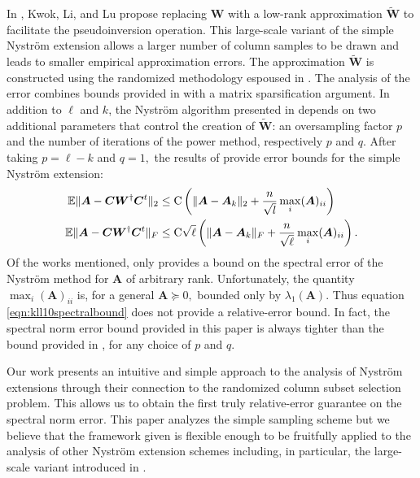 \documentclass[11pt,letterpaper,twoside,reqno,nosumlimits]{amsart}
\newcommand{\mat}[1]{\ensuremath{\bm{#1}}}
\newcommand{\E}{\ensuremath{\mathbb{E}}}
\theoremstyle{remark}
\begin{document}
  In \cite{KLL10}, Kwok, Li, and Lu propose replacing $\mat{W}$ with a low-rank approximation $\tilde{\mat{W}}$ to facilitate the pseudoinversion operation. This large-scale variant of the simple Nystr\"om extension allows a larger number of column samples to be drawn and leads to smaller empirical approximation errors. The approximation $\tilde{\mat{W}}$ is constructed using the randomized methodology espoused in \cite{HMT11}. The analysis of the error combines bounds provided in \cite{HMT11} with a matrix sparsification argument. In addition to $\ell$ and $k$, the Nystr\"om algorithm presented in \cite{KLL10} depends on two additional parameters that control the creation of $\tilde{\mat{W}}$: an oversampling factor $p$ and the number of iterations of the power method, respectively $p$ and $q.$ 
After taking $p = \ell -k$ and $q=1,$ the results of \cite{KLL10} provide error bounds for the simple Nystr\"om extension:
\begin{align}
 \E\| \mat{A} - \mat{C}\mat{W}^\dagger \mat{C}^t\|_2 & \leq \mathrm{C} \left(\|\mat{A} - \mat{A}_k\|_2 + \frac{n}{\sqrt{l}} \max_i (\mat{A})_{ii} \right) \label{eqn:kll10spectralbound}\\
 \E\| \mat{A} - \mat{C}\mat{W}^\dagger \mat{C}^t\|_F & \leq \mathrm{C} \sqrt{\ell} \left( \|\mat{A} - \mat{A}_k\|_F + \frac{n}{\sqrt{\ell}} \max_i (\mat{A})_{ii} \right). \notag
\end{align}
 Of the works mentioned, only \cite{KLL10} provides a bound on the spectral error of the Nystr\"om method for $\mat{A}$ of arbitrary rank. Unfortunately, the quantity $\max_i (\mat{A})_{ii}$ is, for a general $\mat{A} \succeq 0,$ bounded only by $\lambda_1(\mat{A}).$ Thus equation \eqref{eqn:kll10spectralbound} does not provide a relative-error bound. In fact, the spectral norm error bound provided in this paper is always tighter than the bound provided in \cite{KLL10}, for any choice of $p$ and $q.$ 
 
Our work presents an intuitive and simple approach to the analysis of Nystr\"om extensions through their connection to the randomized column subset selection problem. This allows us to obtain the first truly relative-error guarantee on the spectral norm error. This paper analyzes the simple sampling scheme but we believe that the framework given is flexible enough to be fruitfully applied to the analysis of other Nystr\"om extension schemes including, in particular, the large-scale variant introduced in \cite{KLL10}.
\end{document}
